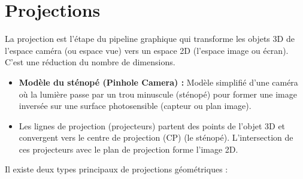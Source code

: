\documentclass{article}
\begin{document}
\section{Projections}

La projection est l'étape du pipeline graphique qui transforme les objets 3D de l'espace caméra (ou espace vue) vers un espace 2D (l'espace image ou écran). C'est une réduction du nombre de dimensions.

\begin{itemize}
    \item \textbf{Modèle du sténopé (Pinhole Camera) :} Modèle simplifié d'une caméra où la lumière passe par un trou minuscule (sténopé) pour former une image inversée sur une surface photosensible (capteur ou plan image).
    \item Les lignes de projection (projecteurs) partent des points de l'objet 3D et convergent vers le centre de projection (CP) (le sténopé). L'intersection de ces projecteurs avec le plan de projection forme l'image 2D.
\end{itemize}

Il existe deux types principaux de projections géométriques :
\end{document}
